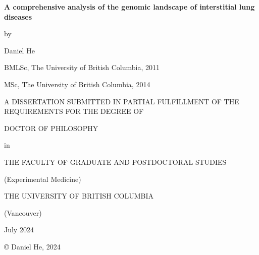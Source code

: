 \documentclass[
]{article}
\author{}
\date{\vspace{-2.5em}}
\begin{document}
\thispagestyle{empty}
\begin{singlespace} 
\begin{center}

\Huge

\textbf{A comprehensive analysis of the genomic landscape of interstitial lung diseases}

\Large

\vspace{8mm}

by

\vspace{8mm}

\huge

Daniel He

\Large

\vspace{8mm}

BMLSc, The University of British Columbia, 2011

MSc, The University of British Columbia, 2014

\vspace{10mm}

A DISSERTATION SUBMITTED IN PARTIAL FULFILLMENT OF THE REQUIREMENTS FOR THE DEGREE OF

\vspace{5mm}

DOCTOR OF PHILOSOPHY

\vspace{5mm}
in

\vspace{5mm}

THE FACULTY OF GRADUATE AND POSTDOCTORAL STUDIES

\vspace{5mm}

(Experimental Medicine)

\vspace{5mm}

THE UNIVERSITY OF BRITISH COLUMBIA

\vspace{5mm}

(Vancouver)

\vspace{6mm}

July 2024

© Daniel He, 2024

\end{center}
\end{singlespace}
\normalsize
\clearpage

\setcounter{page}{2}
\end{document}
